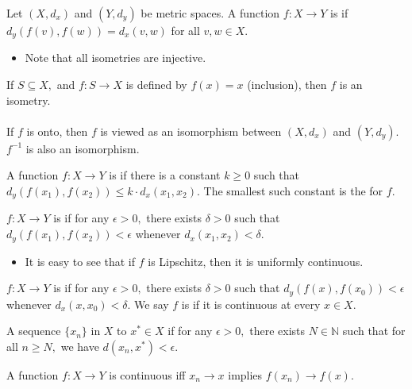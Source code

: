 \begin{defn}
Let $(X,d_x)$ and $(Y,d_y)$ be metric spaces. A function $f:X\rightarrow Y$ is  if $d_y(f(v),f(w))=d_x(v,w)$ for all $v,w\in X.$
\end{defn}
\begin{itemize}
\item Note that all isometries are injective.
\end{itemize}

\noindent\Ex If $S\subseteq X,$ and $f:S\rightarrow X$ is defined by $f(x)=x$ (inclusion), then $f$ is an isometry. \\ \\
If $f$ is onto, then $f$ is viewed as an isomorphism between $(X,d_x)$ and $(Y,d_y).$ $f^{-1}$ is also an isomorphism.
\begin{defn} 
A function $f:X\rightarrow Y$ is  if there is a constant $k\geq 0$ such that $d_y(f(x_1),f(x_2))\leq k\cdot d_x(x_1,x_2).$ The smallest such constant is the  for $f.$
\end{defn}

\begin{defn} 
$f:X\rightarrow Y$ is  if for any $\epsilon>0,$ there exists $\delta>0$ such that $d_y(f(x_1),f(x_2))<\epsilon$ whenever $d_x(x_1,x_2)<\delta.$
\end{defn}
\begin{itemize}
\item It is easy to see that if $f$ is Lipschitz, then it is uniformly continuous.
\end{itemize}

\begin{defn} 
$f:X\rightarrow Y$ is  if for any $\epsilon>0,$ there exists $\delta>0$ such that $d_y(f(x),f(x_0))<\epsilon$ whenever $d_x(x,x_0)<\delta.$ We say $f$ is  if it is continuous at every $x\in X.$
\end{defn}

\begin{defn} 
A sequence $\{x_n\}$ in $X$  to $x^*\in X$ if for any $\epsilon>0,$ there exists $N\in\mathbb{N}$ such that for all $n\geq N,$ we have $d(x_n,x^*)<\epsilon.$
\end{defn}

\begin{prop} 
A function $f:X\rightarrow Y$ is continuous iff $x_n\rightarrow x$ implies $f(x_n)\rightarrow f(x).$ \\ \\
\end{prop}

